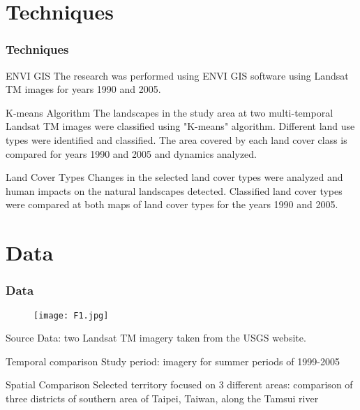 \documentclass[pdflatex,compress,8pt,
	xcolor={dvipsnames,dvipsnames,svgnames,x11names,table},
	hyperref={	
	breaklinks = true, 
	pdfauthor={Lemenkova Polina}, 
	pdfsubject={Preentation}, 
	pdfcreator={Lemenkova Polina}, 
	pdfproducer={Lemenkova Polina}, 
	colorlinks=true,
	linkcolor=Gold1, 
	citecolor=NavyBlue, 
	urlcolor = NavyBlue, 
	breaklinks = true}]{beamer}
\begin{document}
\section{Techniques}
\begin{frame}\frametitle{Techniques}

\begin{alertblock}{ENVI GIS}
The research was performed using ENVI GIS software using Landsat TM images for years 1990 and 2005.
\end{alertblock}

\begin{block}{K-means Algorithm}
The landscapes in the study area at two multi-temporal Landsat TM images were classified using "K-means" algorithm. Different land use types were identified and classified. The area covered by each land cover class is compared for years 1990 and 2005 and dynamics analyzed.
\end{block}

\begin{block}{Land Cover Types}
Changes in the selected land cover types were analyzed and human impacts on the natural landscapes detected. Classified land cover types were compared at both maps of land cover types for the years 1990 and 2005.
\end{block}

\end{frame}

\section{Data}
\begin{frame}\frametitle{Data}
\begin{figure}[H]
	\centering
		\texttt{[image: F1.jpg]}
\end{figure}

\begin{alertblock}{Source}
Data: two Landsat TM imagery taken from the USGS website. 
\end{alertblock}

\begin{block}{Temporal comparison}
Study period: imagery for summer periods of 1999-2005 
\end{block}

\begin{examples}{Spatial Comparison}
Selected territory focused on \alert{3 different areas}: comparison of three districts of southern area of Taipei, Taiwan, along the Tamsui river
\end{examples} 
\end{frame}
\end{document}
